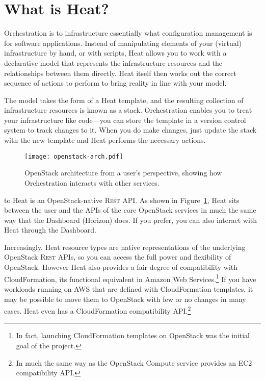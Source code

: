 \section{What is Heat?}

Orchestration is to infrastructure essentially what configuration management is for software applications. Instead of manipulating elements of your (virtual) infrastructure by hand, or with scripts, Heat allows you to work with a declarative model that represents the infrastructure resources and the relationships between them directly. Heat itself then works out the correct sequence of actions to perform to bring reality in line with your model.

The model takes the form of a Heat template, and the resulting collection of infrastructure resources is known as a stack. Orchestration enables you to treat your infrastructure like code---you can store the template in a version control system to track changes to it. When you do make changes, just update the stack with the new template and Heat performs the necessary actions.

\begin{figure}[b]
\centering
\texttt{[image: openstack-arch.pdf]}
\caption{OpenStack architecture from a user's perspective, showing how Orchestration interacts with other services.}
\label{fig:openstack-arch}
\end{figure}

 to Heat is an OpenStack-native \textsc{Rest} API. As shown in Figure~\ref{fig:openstack-arch}, Heat sits between the user and the APIs of the core OpenStack services in much the same way that the Dashboard (Horizon) does. If you prefer, you can also interact with Heat through the Dashboard.

Increasingly, Heat resource types are native representations of the underlying OpenStack \textsc{Rest} APIs, so you can access the full power and flexibility of OpenStack. However Heat also provides a fair degree of compatibility with CloudFormation, its functional equivalent in Amazon Web Services.\footnote{In fact, launching CloudFormation templates on OpenStack was the initial goal of the project.} If you have workloads running on AWS that are defined with CloudFormation templates, it may be possible to move them to OpenStack with few or no changes in many cases. Heat even has a CloudFormation compatibility API.\footnote{In much the same way as the OpenStack Compute service provides an EC2 compatibility API.}
